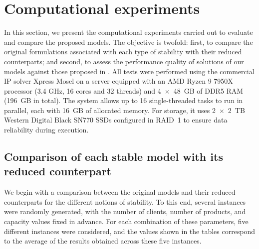 \documentclass[preprint,11pt,authoryear]{elsarticle}
\def\J{\mathcal{J}}
\def\I{\mathcal{I}}
\begin{document}





\section{Computational experiments} \label{sec:compExp}   
In this section, we present the computational experiments carried out to evaluate and compare the proposed models. The objective is twofold: first, to compare the original formulations associated with each type of stability with their reduced counterparts; and second, to assess the performance quality of solutions of our models against those proposed in \cite{calvete2020}. All tests were performed using the commercial IP solver Xpress Mosel on a server equipped with an AMD Ryzen 9 7950X processor (3.4 GHz, 16 cores and 32 threads) and 4~\(\times\)~48~GB of DDR5 RAM (196~GB in total). The system allows up to 16 single-threaded tasks to run in parallel, each with 16~GB of allocated memory. For storage, it uses 2~\(\times\)~2~TB Western Digital Black SN770 SSDs configured in RAID~1 to ensure data reliability during execution.

\subsection{Comparison of each stable model with its reduced counterpart} %
We begin with a comparison between the original models and their reduced counterparts for the different notions of stability. To this end, several instances were randomly generated, with the number of clients, number of products, and capacity values fixed in advance. For each combination of these parameters, five different instances were considered, and the values shown in the tables correspond to the average of the results obtained across these five instances.
\end{document}
